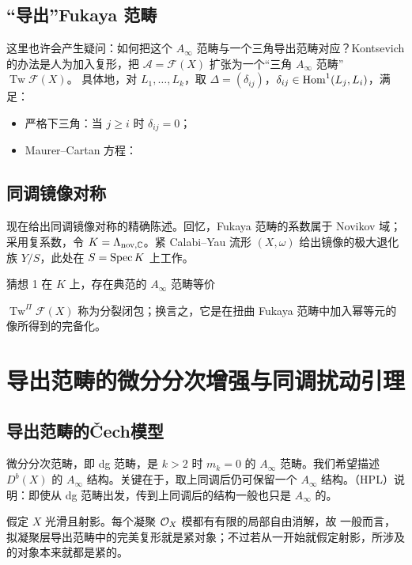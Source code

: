 \subsection{“导出”Fukaya 范畴}
这里也许会产生疑问：如何把这个 $A_\infty$ 范畴与一个三角导出范畴对应？Kontsevich 的办法是人为加入复形，把 $\mathcal A=\mathcal F(X)$ 扩张为一个“三角 $A_\infty$ 范畴” $\operatorname{Tw}\mathcal F(X)$。
具体地，对 $L_1,\ldots,L_k$，取 $\Delta=(\delta_{ij})$，$\delta_{ij}\in\operatorname{Hom}^1(L_j,L_i)$，满足：
\begin{itemize}
\item 严格下三角：当 $j\ge i$ 时 $\delta_{ij}=0$；
\item Maurer–Cartan 方程：
\end{itemize}
\subsection{同调镜像对称}
现在给出同调镜像对称的精确陈述。回忆，Fukaya 范畴的系数属于 Novikov 域；采用复系数，令 $K=\Lambda_{\mathrm{nov},\mathbb C}$。紧 Calabi–Yau 流形 $(X,\omega)$ 给出镜像的极大退化族 $Y/S$，此处在 $S=\operatorname{Spec} K$ 上工作。
\begin{custom}{猜想 1}\hypertarget{conj:1}{}
在 $K$ 上，存在典范的 $A_\infty$ 范畴等价
\end{custom}
$\operatorname{Tw}^{\Pi}\mathcal F(X)$ 称为分裂闭包；换言之，它是在扭曲 Fukaya 范畴中加入幂等元的像所得到的完备化。
\section{导出范畴的微分分次增强与同调扰动引理}
\subsection{导出范畴的\texorpdfstring{Čech}{Čech}模型}
微分分次范畴，即 dg 范畴，是 $k>2$ 时 $m_k=0$ 的 $A_\infty$ 范畴。我们希望描述 $D^b(X)$ 的 $A_\infty$ 结构。关键在于，取上同调后仍可保留一个 $A_\infty$ 结构。（HPL）说明：即使从 dg 范畴出发，传到上同调后的结构一般也只是 $A_\infty$ 的。

假定 $X$ 光滑且射影。每个凝聚 $\mathcal O_X$ 模都有有限的局部自由消解，故
一般而言，拟凝聚层导出范畴中的完美复形就是紧对象；不过若从一开始就假定射影，所涉及的对象本来就都是紧的。

